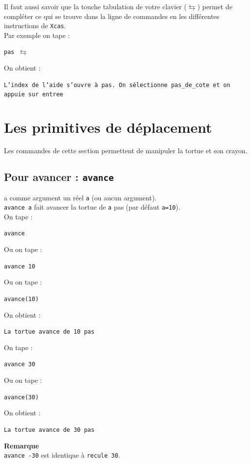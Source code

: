 \documentclass[a4paper,11pt]{book}
\begin{document}
Il faut aussi savoir que la touche tabulation de votre clavier 
($\leftrightarrows$) permet de compl\'eter ce qui se trouve dans la
  ligne de commandes en les diff\'erentes instructions de {\tt Xcas}.\\
Par exemple on tape :\\
\begin{center}{\tt pas $\leftrightarrows$}\end{center}
On obtient :
\begin{center}{\tt L'index de l'aide s'ouvre \`a pas. On s\'electionne {\tt pas\_de\_cote} et on appuie sur entree}\end{center}
\section{Les primitives de d\'eplacement}
Les commandes de cette section permettent de manipuler la tortue et son crayon.

\subsection{Pour avancer : {\tt avance}}
 a comme argument un r\'eel {\tt a} 
(ou aucun argument).\\
{\tt avance a} fait avancer la tortue de {\tt a} pas (par d\'efaut 
{\tt a=10}).\\
On tape :
\begin{center}{\tt avance}\end{center}
Ou on tape :
\begin{center}{\tt avance 10}\end{center}
Ou on tape :
\begin{center}{\tt avance(10)}\end{center}
On obtient :
\begin{center}{\tt  La tortue avance de 10 pas}\end{center}
On tape :
\begin{center}{\tt avance 30}\end{center}
Ou on tape :
\begin{center}{\tt avance(30)}\end{center}
On obtient :
\begin{center}{\tt  La tortue avance de 30 pas}\end{center}
{\bf Remarque}\\
{\tt avance -30} est identique \`a {\tt recule 30}.
\end{document}
